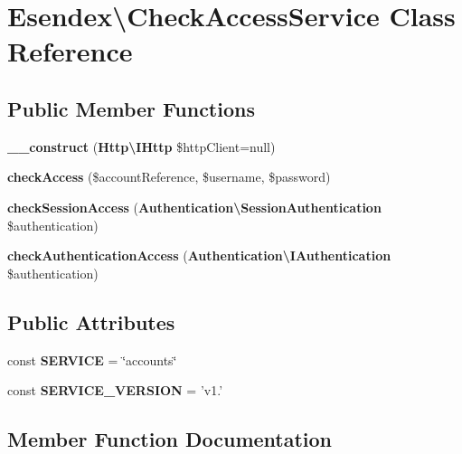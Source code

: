\section{Esendex\textbackslash{}Check\-Access\-Service Class Reference}
\label{class_esendex_1_1_check_access_service}
\subsection*{Public Member Functions}
\begin{DoxyCompactItemize}
\item 
{\bfseries \-\_\-\-\_\-construct} ({\bf Http\textbackslash{}\-I\-Http} \$http\-Client=null)\label{class_esendex_1_1_check_access_service_ae800a5fd028d730f798aa297b92eb06a}

\item 
{\bf check\-Access} (\$account\-Reference, \$username, \$password)
\item 
{\bf check\-Session\-Access} ({\bf Authentication\textbackslash{}\-Session\-Authentication} \$authentication)
\item 
{\bf check\-Authentication\-Access} ({\bf Authentication\textbackslash{}\-I\-Authentication} \$authentication)
\end{DoxyCompactItemize}
\subsection*{Public Attributes}
\begin{DoxyCompactItemize}
\item 
const {\bfseries S\-E\-R\-V\-I\-C\-E} = \char`\"{}accounts\char`\"{}\label{class_esendex_1_1_check_access_service_ab9d205a478dda73e534c33e600000551}

\item 
const {\bfseries S\-E\-R\-V\-I\-C\-E\-\_\-\-V\-E\-R\-S\-I\-O\-N} = 'v1.'\label{class_esendex_1_1_check_access_service_ad03c4c0311b54b913607db4ec91ef59c}

\end{DoxyCompactItemize}


\subsection{Member Function Documentation}
